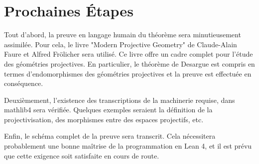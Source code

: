 \documentclass[12pt, oneside]{memoir}
\theoremstyle{definition}
\newtheorem{defn}{Définition}
\newcommand*{\DashedArrow}[1][]{\mathbin{\tikz [baseline=-0.25ex,-latex, dashed,#1] \draw [#1] (0pt,0.5ex) -- (1.3em,0.5ex);}}%
\newcommand{\partialto}{\DashedArrow[->,dash pattern=on 4pt off 2pt]}
\DeclareMathOperator{\kernel}{Ker}
\DeclareMathOperator{\domain}{Dom}
\begin{document}
\section*{Prochaines Étapes}
Tout d'abord, la preuve en langage humain du théorème sera
minutieusement assimilée. Pour cela, le livre "Modern Projective
Geometry" \cite{ff00} de Claude-Alain Faure et Alfred Frölicher sera
utilisé. Ce livre offre un cadre complet pour l'étude des géométries
projectives. En particulier, le théorème de Desargue est compris en
termes d'endomorphismes des géométries projectives et la preuve est
effectuée en conséquence.

Deuxièmement, l'existence des transcriptions de la machinerie requise,
dans mathlib4 sera vérifiée. Quelques exemples seraient la définition
de la projectivisation, des morphismes entre des espaces projectifs,
etc.

Enfin, le schéma complet de la preuve sera transcrit. Cela nécessitera
probablement une bonne maîtrise de la programmation en Lean 4, et il
est prévu que cette exigence soit satisfaite en cours de route.
\nocite{*}
\printbibliography[title=Références,heading=subbibliography]
\end{document}
